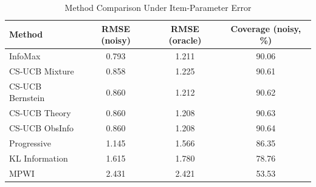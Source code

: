 \begin{table}[htbp]
\centering
\small
\caption{Method Comparison Under Item-Parameter Error}
\label{tab:robustness-method-error}
\begin{tabular}{lccc}
\toprule
Method & RMSE (noisy) & RMSE (oracle) & Coverage (noisy, \%) \\
\midrule
InfoMax & 0.793 & 1.211 & 90.06 \\
CS-UCB Mixture & 0.858 & 1.225 & 90.61 \\
CS-UCB Bernstein & 0.860 & 1.212 & 90.62 \\
CS-UCB Theory & 0.860 & 1.208 & 90.63 \\
CS-UCB ObsInfo & 0.860 & 1.208 & 90.64 \\
Progressive & 1.145 & 1.566 & 86.35 \\
KL Information & 1.615 & 1.780 & 78.76 \\
MPWI & 2.431 & 2.421 & 53.53 \\
\bottomrule
\end{tabular}
\end{table}
